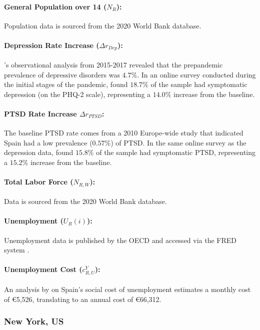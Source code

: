\documentclass[msom,blindrev]{informs3} %
\begin{document}
\begin{APPENDICES}
\paragraph{General Population over 14 ($N_{R}$):} Population data is sourced from the 2020 World Bank database.
\paragraph{Depression Rate Increase ($\Delta r_{Dep}$):} 's observational analysis from 2015-2017 revealed that the prepandemic prevalence of depressive disorders was $4.7\%$. In an online survey conducted during the initial stages of the pandemic,  found $18.7\%$ of the sample had symptomatic depression (on the PHQ-2 scale), representing a $14.0\%$ increase from the baseline. 


\paragraph{PTSD Rate Increase $\Delta r_{PTSD}$:} The baseline PTSD rate comes from a 2010 Europe-wide study  that indicated Spain had a low prevalence ($0.57\%$) of PTSD. In the same online survey as the depression data,  found $15.8\%$ of the sample had symptomatic PTSD, representing a $15.2\%$ increase from the baseline.
\paragraph{Total Labor Force ($N_{R,W}$):} Data is sourced from the 2020 World Bank database.

\paragraph{Unemployment ($U_R(i)$):} Unemployment data is published by the OECD and accessed via the FRED system .

\paragraph{Unemployment Cost ($c^Y_{R,U}$):} An analysis by  on Spain’s social cost of unemployment estimates a monthly cost of \euro5,526, translating to an annual cost of \euro66,312.

\subsubsection{New York, US}


\end{APPENDICES}
\end{document}
